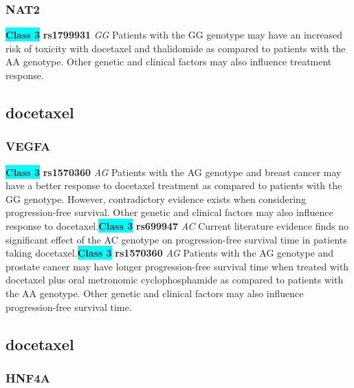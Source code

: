 \documentclass{book}
\begin{document}
\subsubsection{ NAT2 }

\begin{center}
\textbf{\colorbox{cyan} {Class 3}} \textbf{ rs1799931 } \textit{ GG }
Patients with the GG genotype may have an increased risk of toxicity with docetaxel and thalidomide as compared to patients with the AA genotype. Other genetic and clinical factors may also influence treatment response.


\end{center}\subsection{ docetaxel }


\subsubsection{ VEGFA }

\begin{center}
\textbf{\colorbox{cyan} {Class 3}} \textbf{ rs1570360 } \textit{ AG }
Patients with the AG genotype and breast cancer may have a better response to docetaxel treatment as compared to patients with the GG genotype. However, contradictory evidence exists when considering progression-free survival. Other genetic and clinical factors may also influence response to docetaxel.\textbf{\colorbox{cyan} {Class 3}} \textbf{ rs699947 } \textit{ AC }
Current literature evidence finds no significant effect of the AC genotype on progression-free survival time in patients taking docetaxel.\textbf{\colorbox{cyan} {Class 3}} \textbf{ rs1570360 } \textit{ AG }
Patients with the AG genotype and prostate cancer may have longer progression-free survival time when treated with docetaxel plus oral metronomic cyclophosphamide as compared to patients with the AA genotype. Other genetic and clinical factors may also influence progression-free survival time.


\end{center}\subsection{ docetaxel }


\subsubsection{ HNF4A }
\end{document}

